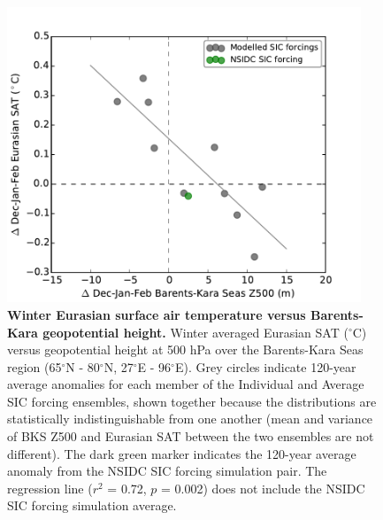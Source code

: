 \documentclass{nature}
\begin{document}
\begin{figure}%
\centering
\noindent\includegraphics[width=25pc]{Figure5.pdf}
\caption{\textbf{Winter Eurasian surface air temperature versus Barents-Kara geopotential height.} Winter averaged Eurasian SAT ($^\circ$C) versus geopotential height at 500 hPa over the Barents-Kara Seas region (65$^\circ$N - 80$^\circ$N, 27$^\circ$E - 96$^\circ$E). Grey circles indicate 120-year average anomalies for each member of the Individual and Average SIC forcing ensembles, shown together because the distributions are statistically indistinguishable from one another (mean and variance of BKS Z500 and Eurasian SAT between the two ensembles are not different). The dark green marker indicates the 120-year average anomaly from the NSIDC SIC forcing simulation pair. The regression line ($r^2$ = 0.72, $p$ = 0.002) does not include the NSIDC SIC forcing simulation average.
}
\label{fig:fig5} 
\end{figure}
\end{document}
